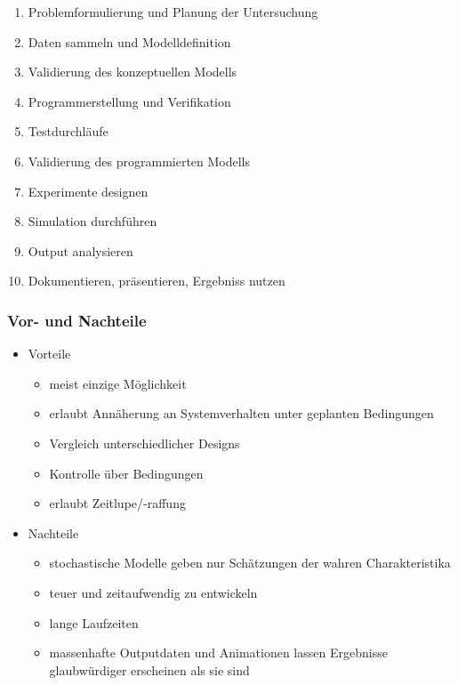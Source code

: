 \documentclass[nonacm=true, language=german]{acmart}
\begin{document}
\begin{enumerate}
    \item Problemformulierung und Planung der Untersuchung
    \item Daten sammeln und Modelldefinition
    \item Validierung des konzeptuellen Modells
    \item Programmerstellung und Verifikation
    \item Testdurchläufe
    \item Validierung des programmierten Modells
    \item Experimente designen
    \item Simulation durchführen
    \item Output analysieren
    \item Dokumentieren, präsentieren, Ergebniss nutzen
\end{enumerate}

\subsubsection{Vor- und Nachteile}

\begin{itemize}
    \item Vorteile
    \begin{itemize}
        \item meist einzige Möglichkeit
        \item erlaubt Annäherung an Systemverhalten unter geplanten Bedingungen
        \item Vergleich unterschiedlicher Designs
        \item Kontrolle über Bedingungen
        \item erlaubt Zeitlupe/-raffung
    \end{itemize}
    \item Nachteile
    \begin{itemize}
        \item stochastische Modelle geben nur Schätzungen der wahren Charakteristika
        \item teuer und zeitaufwendig zu entwickeln
        \item lange Laufzeiten
        \item massenhafte Outputdaten und Animationen lassen Ergebnisse glaubwürdiger erscheinen als sie sind
    \end{itemize}
\end{itemize}
\end{document}
